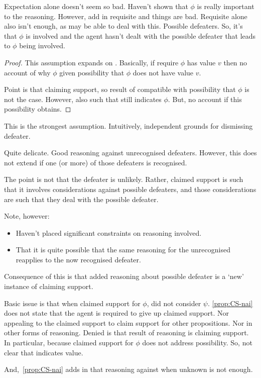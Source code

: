 \begin{note}
  Expectation alone doesn't seem so bad.
  Haven't shown that \(\phi\) is really important to the reasoning.
  However, add in requisite and things are bad.
  Requisite alone also isn't enough, as may be able to deal with this.
  Possible defeaters.
  So, it's that \(\phi\) is involved and the agent hasn't dealt with the possible defeater that leads to \(\phi\) being involved.

  \begin{proof}
    This assumption expands on \eiS{}.
    Basically, if require \(\phi\) has value \(v\) then no account of why \(\phi\) given possibility that \(\phi\) does not have value \(v\).

    Point is that claiming support, so result of compatible with possibility that \(\phi\) is not the case.
    However, also such that still indicates \(\phi\).
    But, no account if this possibility obtains.
  \end{proof}

  This is the strongest assumption.
  Intuitively, independent grounds for dismissing defeater.

  Quite delicate.
  Good reasoning against unrecognised defeaters.
  However, this does not extend if one (or more) of those defeaters is recognised.

  The point is not that the defeater is unlikely.
  Rather, claimed support is such that it involves considerations against possible defeaters, and those considerations are such that they deal with the possible defeater.
\end{note}

\begin{note}
  Note, however:

  \begin{itemize}
  \item Haven't placed significant constraints on reasoning involved.
  \item That it is quite possible that the same reasoning for the unrecognised reapplies to the now recognised defeater.
  \end{itemize}
\end{note}

\begin{note}
  Consequence of this is that added reasoning about possible defeater is a `new' instance of claiming support.
\end{note}

\begin{note}
  Basic issue is that when claimed support for \(\phi\), did not consider \(\psi\).
  \autoref{prop:CS-nai} does not state that the agent is required to give up claimed support.
  Nor appealing to the claimed support to claim support for other propositions.
  Nor in other forms of reasoning.
  Denied is that result of reasoning is claiming support.
  In particular, because claimed support for \(\phi\) does not address possibility.
  So, not clear that indicates value.

  And,~\autoref{prop:CS-nai} adds in that reasoning against when unknown is not enough.
\end{note}

